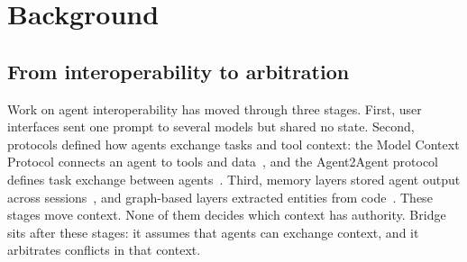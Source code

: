 \section{Background}
\label{sec:background}

\subsection{From interoperability to arbitration}
Work on agent interoperability has moved through three stages. First, user interfaces sent one prompt to several models but shared no state. Second, protocols defined how agents exchange tasks and tool context: the Model Context Protocol connects an agent to tools and data~\cite{mcp2025}, and the Agent2Agent protocol defines task exchange between agents~\cite{a2a2025}. Third, memory layers stored agent output across sessions~\cite{packer2023memgpt,chhikara2025mem0,rasmussen2025zep,honcho2026}, and graph-based layers extracted entities from code~\cite{cognee2026}. These stages move context. None of them decides which context has authority. Bridge sits after these stages: it assumes that agents can exchange context, and it arbitrates conflicts in that context.

